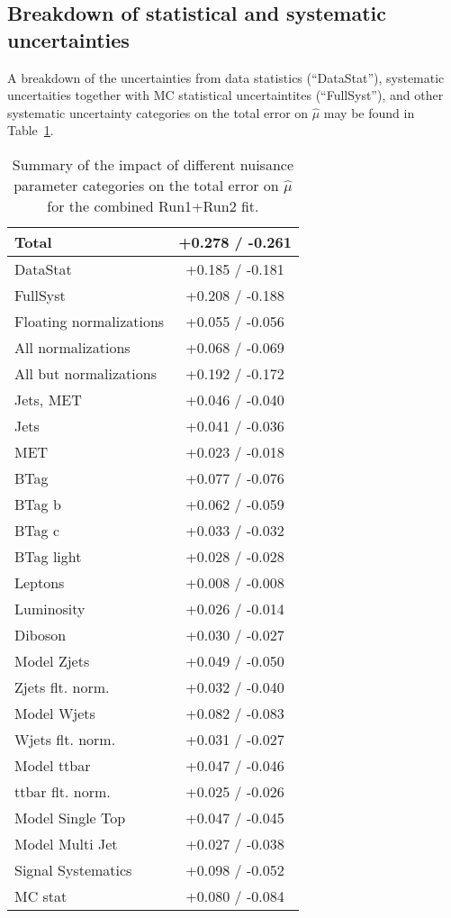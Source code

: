 \def\to{\ensuremath{\rightarrow}}
\def\bb{\ensuremath{b\bar{b}}}

\subsection{Breakdown of statistical and systematic uncertainties}
A breakdown of the uncertainties from data statistics (``DataStat''), systematic uncertaities together with MC statistical uncertaintites (``FullSyst''), and other systematic uncertainty categories on the total error on $\hat{\mu}$ may be found in Table~\ref{tab:combbreakdown}.

\begin{table}[!htbp]
\begin{center}\begin{tabular}{|l|c|}
\hline
Total & +0.278 / -0.261 \\\hline
DataStat & +0.185 / -0.181 \\
FullSyst & +0.208 / -0.188 \\\hline
Floating normalizations & +0.055 / -0.056 \\
All normalizations & +0.068 / -0.069 \\
All but normalizations & +0.192 / -0.172 \\
Jets, MET & +0.046 / -0.040 \\
Jets & +0.041 / -0.036 \\
MET & +0.023 / -0.018 \\
BTag & +0.077 / -0.076 \\
BTag b & +0.062 / -0.059 \\
BTag c & +0.033 / -0.032 \\
BTag light & +0.028 / -0.028 \\
Leptons & +0.008 / -0.008 \\
Luminosity & +0.026 / -0.014 \\
Diboson &  +0.030 / -0.027 \\
Model Zjets & +0.049 / -0.050 \\
Zjets flt. norm. & +0.032 / -0.040 \\
Model Wjets & +0.082 / -0.083 \\
Wjets flt. norm. & +0.031 / -0.027 \\
Model ttbar & +0.047 / -0.046 \\
ttbar flt. norm. & +0.025 / -0.026 \\
Model Single Top & +0.047 / -0.045 \\
Model Multi Jet & +0.027 / -0.038 \\
Signal Systematics & +0.098 / -0.052 \\
MC stat & +0.080 / -0.084 \\
\hline
\end{tabular}
\caption{Summary of the impact of different nuisance parameter categories on the total error on $\hat{\mu}$ for the combined Run1+Run2 fit.}
\label{tab:combbreakdown}
\end{center}
\end{table}

